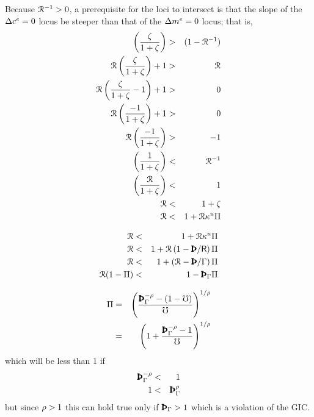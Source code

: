 \documentclass{handout}
\begin{document}
Because $\mathcal{R}^{-1}>0$, a prerequisite for the loci to intersect 
is that the slope of the $\Delta c^{e}=0$ locus
be steeper than that of the $\Delta m^{e} = 0$ locus; that is,
\begin{eqnarray}
\left(\frac{\zeta}{1+\zeta}\right) & > & (1-\mathcal{R}^{-1})
\\ \mathcal{R} \left(\frac{\zeta}{1+\zeta}\right)+1 & > & \mathcal{R}
\\ \mathcal{R} \left(\frac{\zeta}{1+\zeta}-1\right)+1 & > & 0
\\ \mathcal{R} \left(\frac{-1}{1+\zeta}\right)+1 & > & 0
\\ \mathcal{R} \left(\frac{-1}{1+\zeta}\right) & > & -1
\\  \left(\frac{1}{1+\zeta}\right) & < & \mathcal{R}^{-1}
\\  \left(\frac{\mathcal{R}}{1+\zeta }\right) & < & 1
\\  \mathcal{R} & < & 1+\zeta
\\  \mathcal{R} & < & 1+\mathcal{R} \kappa^{u} \Pi
\end{eqnarray}

\begin{eqnarray}
  \Rnorm & < & 1+\Rnorm \MPCU \straight
\\   \Rnorm & < & 1+\Rnorm \left(1-\Pat/\Rfree\right) \straight
\\   \Rnorm & < & 1+ \left(\Rnorm-\Pat/\PGro\right) \straight
\\   \Rnorm(1-\straight) & < & 1 - \PatPGro  \straight
\end{eqnarray}

\begin{eqnarray}
  \straight & = & \left(\frac{\PatPGro^{-\CRRA}-(1-\urate)}{\urate}\right)^{1/\CRRA} 
\\ & = & \left(1+\frac{\PatPGro^{-\CRRA}-1}{\urate}\right)^{1/\CRRA} 
\end{eqnarray}
which will be less than 1 if 
\begin{eqnarray}
 \PatPGro^{-\CRRA} & < & 1 
\\ 1 & < & \PatPGro^{\CRRA}
\end{eqnarray}
but since $\rho > 1$ this can hold true only if $\PatPGro > 1$ which is a violation of the GIC.  
\end{document}
